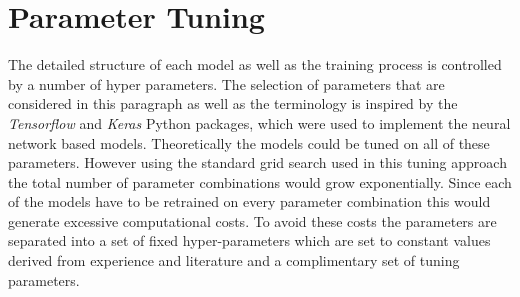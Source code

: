 \section{Parameter Tuning}
The detailed structure of each model as well as the training process is controlled by a number of hyper parameters. The selection of parameters that are considered in this paragraph as well as the terminology is inspired by the \textit{Tensorflow} and \textit{Keras} Python packages, which were used to implement the neural network based models. Theoretically the models could be tuned on all of these parameters. However using the standard grid search used in this tuning approach the total number of parameter combinations would grow exponentially. Since each of the models have to be retrained on every parameter combination this would generate excessive computational costs. To avoid these costs the parameters are separated into a set of fixed hyper-parameters which are set to constant values derived from experience and literature and a complimentary set of tuning parameters.
